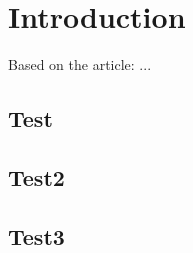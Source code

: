 \chapter{Introduction}
\minitoc
\begin{bottomparagraph}
Based on the article: ...
\end{bottomparagraph}

\lipsum[2-5]

\section{Test}
\lipsum[2-5]

\section{Test2}
\lipsum[2-5]

\section{Test3}
\lipsum[2-5]